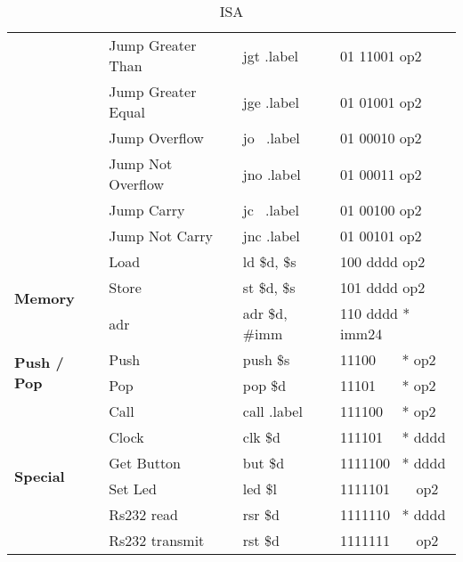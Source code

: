 \begin{table}[H]
{\begin{tabular}{|p{2cm}|l|l|l|}
 & Jump Greater Than & jgt .label & 01 11001 op2 \\ \cline{ 2- 4}
 & Jump Greater Equal & jge .label & 01 01001 op2 \\ \cline{ 2- 4}
 & Jump Overflow & jo \ .label & 01 00010 op2 \\ \cline{ 2- 4}
 & Jump Not Overflow & jno .label & 01 00011 op2 \\ \cline{ 2- 4}
 & Jump Carry & jc \ .label & 01 00100 op2 \\ \cline{ 2- 4}
 & Jump Not Carry & jnc .label & 01 00101 op2 \\ \hline
\multirow{3}{*}{\textbf{Memory}} & Load & ld \$d, \$s & 100 dddd op2 \\ \cline{ 2- 4}
 & Store & st \$d, \$s & 101 dddd op2 \\ \cline{ 2- 4}
 & adr & adr \$d, \#imm & 110 dddd * imm24 \\ \hline
\multirow{2}{*}{\parbox{2cm}{\textbf{Push / Pop}}} & Push & push \$s & 11100 \ \ \ * op2 \\ \cline{ 2- 4}
 & Pop & pop \$d & 11101 \ \ \ * op2 \\ \hline
\multirow{6}{*}{\textbf{Special}} & Call & call .label & 111100 \ \ * op2 \\ \cline{ 2- 4}
 & Clock & clk \$d & 111101 \ \ * dddd \\ \cline{ 2- 4}
 & Get Button & but \$d & 1111100 \ * dddd \\ \cline{ 2- 4}
 & Set Led & led \$l & 1111101 \ \ \ op2 \\ \cline{ 2- 4}
 & Rs232 read & rsr \$d & 1111110 \ * dddd \\ \cline{ 2- 4}
 & Rs232 transmit & rst \$d & 1111111 \ \ \ op2 \\ \hline
\end{tabular}
}
\caption{\label{AP:ISA}ISA}
\end{table}
